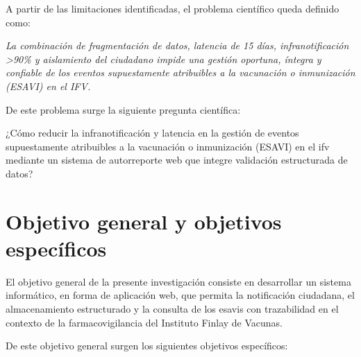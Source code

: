 A partir de las limitaciones identificadas, el problema científico queda definido como:

\textit{La combinación de fragmentación de datos, latencia de 15 días, infranotificación >90\% y aislamiento del ciudadano impide una gestión oportuna, íntegra y confiable de los eventos supuestamente atribuibles a la vacunación o inmunización (ESAVI) en el IFV.}

De este problema surge la siguiente pregunta científica:

¿Cómo reducir la infranotificación y latencia en la gestión de eventos supuestamente atribuibles a la vacunación o inmunización (ESAVI) en el \gls{ifv} mediante un sistema de autorreporte web que integre validación estructurada de datos?

\section{Objetivo general y objetivos específicos}\label{section:objetivosPrincipalesEspecificos}

El objetivo general de la presente investigación consiste en desarrollar un sistema informático, en forma de aplicación web, que permita la notificación ciudadana, el almacenamiento estructurado y la consulta de los \glspl{esavi} con trazabilidad en el contexto de la farmacovigilancia del Instituto Finlay de Vacunas.

De este objetivo general surgen los siguientes objetivos específicos:

